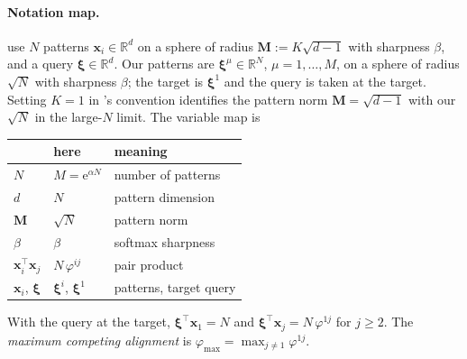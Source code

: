 \documentclass[letterpaper]{article} %
\newcommand{\bxi}{\boldsymbol{\xi}}
\newcommand{\e}{{\mathrm{e}}}
\newcommand{\Bnet}{\beta}
\begin{document}
\paragraph{Notation map.}
\citeauthor{ramsauer2021hopfield} use $N$ patterns
$\bm x_i \in \mathbb R^d$ on a sphere of radius
$\mathbf M := K\sqrt{d-1}$ with sharpness $\beta$, and a query
$\bm \xi \in \mathbb R^d$.  Our patterns are
$\bxi^\mu \in \mathbb R^N$, $\mu = 1, \dots, M$, on a sphere of
radius $\sqrt N$ with sharpness $\Bnet$; the target is $\bxi^1$ and
the query is taken at the target.  Setting $K = 1$ in
\citeauthor{ramsauer2021hopfield}'s convention identifies the
pattern norm $\mathbf M = \sqrt{d-1}$ with our $\sqrt N$ in the
large-$N$ limit.  The variable map is
\begin{center}
\begin{tabular}{lll}
\hline
\citeauthor{ramsauer2021hopfield} & here & meaning \\
\hline
$N$ & $M = \e^{\alpha N}$ & number of patterns \\
$d$ & $N$ & pattern dimension \\
$\mathbf M$ & $\sqrt N$ & pattern norm \\
$\beta$ & $\Bnet$ & softmax sharpness \\
$\bm x_i^\top \bm x_j$ & $N\,\varphi^{ij}$ & pair product \\
$\bm x_i$, $\bm \xi$ & $\bxi^i$, $\bxi^1$ & patterns, target query \\
\hline
\end{tabular}
\end{center}
With the query at the target, $\bm \xi^\top \bm x_1 = N$ and
$\bm \xi^\top \bm x_j = N\,\varphi^{1j}$ for $j \geq 2$.  The
\emph{maximum competing alignment} is
$\varphi_{\max} = \max_{j \neq 1}\varphi^{1j}$.
\end{document}
